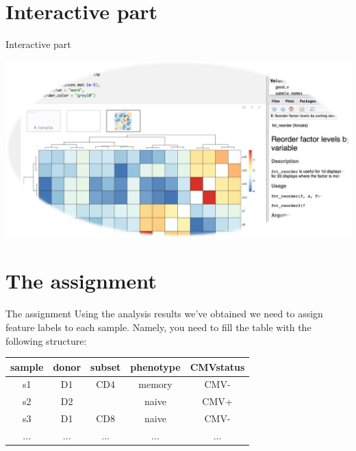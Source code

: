 \documentclass[12pt]{beamer}
\begin{document}
\section{Interactive part}

\begin{frame}{Interactive part}
\begin{center}
\includegraphics[width=\textwidth]{../splash}
\end{center}
\end{frame}

\section{The assignment}

\begin{frame}{The assignment}
Using the analysis results we've obtained we need to assign feature labels to each sample. Namely, you need to fill the table with the following structure:
\begin{table}[h!]
  \begin{center}
    \begin{tabular}{c|c|c|c|c}
      \textbf{sample} & \textbf{donor} & \textbf{subset} & \textbf{phenotype} & \textbf{CMVstatus} \\
      \hline
      s1 & D1 & CD4 & memory & CMV- \\
      s2 & D2 &   & naive & CMV+ \\
      s3 & D1 & CD8 & naive & CMV- \\
      ... & ... & ... & ... & ... \\
    \end{tabular}
  \end{center}
\end{table}
\end{frame}
\end{document}
